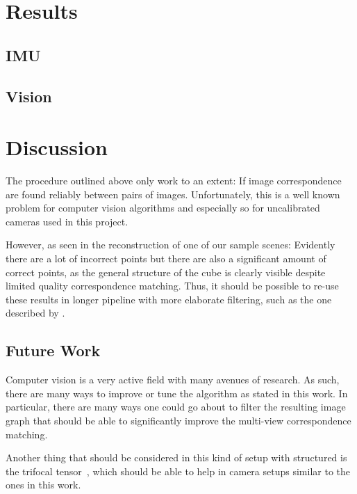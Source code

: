 \documentclass[preprint,acmtog]{acmart}
\begin{document}
\section{Results}

\subsection{IMU}



\subsection{Vision}



\section{Discussion}



The procedure outlined above only work to an extent: If image correspondence are
found reliably between pairs of images. Unfortunately, this is a well known
problem for computer vision algorithms and especially so for uncalibrated
cameras used in this project.

However, as seen in the reconstruction of one of our sample scenes: Evidently
there are a lot of incorrect points but there are also a significant amount of
correct points, as the general structure of the cube is clearly visible despite
limited quality correspondence matching. Thus, it should be possible to re-use
these results in longer pipeline with more elaborate filtering, such as the one
described by \cite{ftc2016}.



\subsection{Future Work}

Computer vision is a very active field with many avenues of research. As such,
there are many ways to improve or tune the algorithm as stated in this work. In
particular, there are many ways one could go about to filter the resulting image
graph that should be able to significantly improve the multi-view correspondence
matching.

Another thing that should be considered in this kind of setup with structured is
the trifocal tensor~\cite{Martyushev_2017}, which should be able to help in
camera setups similar to the ones in this work.
\end{document}
